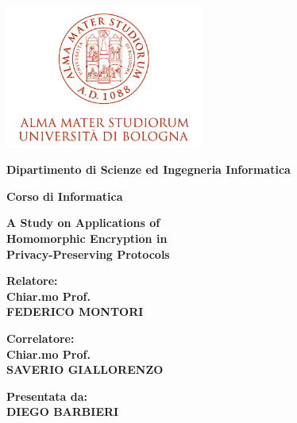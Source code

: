 \documentclass[12pt,a4paper,twoside]{book}
\begin{document}
\pagestyle{empty}

\begin{titlepage}

\begin{center}

\includegraphics[width=6.5cm,height=4.7cm]{img/marchio-di-ateneo.png}

\vspace{10mm}

{\large{\bf{Dipartimento di Scienze ed Ingegneria Informatica}}}

\vspace{5mm}

{\Large{\bf{Corso di Informatica}}}

\vspace{15mm}

{\Huge{\bf A Study on Applications of }}\\
\vspace{3mm}
{\Huge{\bf Homomorphic Encryption in }}\\
\vspace{3mm}
{\Huge{\bf Privacy-Preserving Protocols}} \\

\end{center}

\vspace{10mm}

\begin{minipage}[t]{0.50\textwidth}
{\large{\bf Relatore: \\ Chiar.mo Prof.\\ FEDERICO MONTORI}}

\vspace{3mm}

{\large{\bf Correlatore: \\ Chiar.mo Prof.\\ SAVERIO GIALLORENZO}}
\end{minipage}
\hfill
\begin{minipage}[t]{0.40\textwidth}\raggedleft
{\large{\bf Presentata da: \\ DIEGO BARBIERI}}
\end{minipage}


\end{titlepage}
\end{document}
